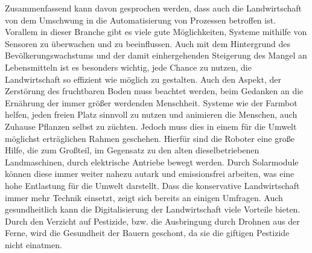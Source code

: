 Zusammenfassend kann davon gesprochen werden, dass auch die Landwirtschaft von dem
Umschwung in die Automatisierung von Prozessen betroffen ist. Vorallem in
dieser Branche gibt es viele gute Möglichkeiten, Systeme mithilfe von Sensoren
zu überwachen und zu beeinflussen. Auch mit dem Hintergrund des
Bevölkerungswachstums und der damit einhergehenden Steigerung des Mangel an
Lebensmitteln ist es besonders wichtig, jede Chance zu nutzen, die
Landwirtschaft so effizient wie möglich zu gestalten. Auch den Aspekt, der
Zerstörung des fruchtbaren Boden muss beachtet werden, beim Gedanken an die
Ernährung der immer größer werdenden Menschheit.\cite{rainer2003diskurs}
Systeme wie der Farmbot helfen, jeden freien Platz sinnvoll zu nutzen und
animieren die Menschen, auch Zuhause Pflanzen selbst zu züchten. Jedoch muss
dies in einem für die Umwelt möglichst erträglichen Rahmen geschehen. Hierfür
sind die Roboter eine große Hilfe, die zum Großteil, im Gegensatz zu den alten
dieselbetriebenen Landmaschinen, durch elektrische Antriebe bewegt werden.
Durch Solarmodule können diese immer weiter nahezu autark und emissionsfrei
arbeiten, was eine hohe Entlastung für die Umwelt darstellt. Dass die
konservative Landwirtschaft immer mehr Technik einsetzt, zeigt sich bereits an
einigen Umfragen. 
Auch gesundheitlich kann die Digitalisierung der
Landwirtschaft viele Vorteile bieten. Durch den Verzicht auf Pestizide, bzw.
die Ausbringung durch Drohnen aus der Ferne, wird die Gesundheit der Bauern
geschont, da sie die giftigen Pestizide nicht einatmen.
\cite{jungwirth2022arbeitszeitbedarf}